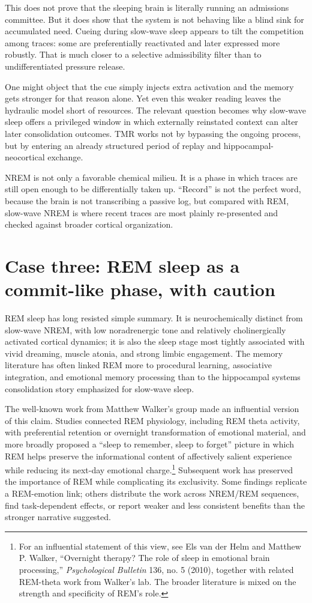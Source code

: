 \documentclass[11pt]{article}
\begin{document}
This does not prove that the sleeping brain is literally running an admissions committee. But it does show that the system is not behaving like a blind sink for accumulated need. Cueing during slow-wave sleep appears to tilt the competition among traces: some are preferentially reactivated and later expressed more robustly. That is much closer to a selective admissibility filter than to undifferentiated pressure release.

One might object that the cue simply injects extra activation and the memory gets stronger for that reason alone. Yet even this weaker reading leaves the hydraulic model short of resources. The relevant question becomes why slow-wave sleep offers a privileged window in which externally reinstated context can alter later consolidation outcomes. TMR works not by bypassing the ongoing process, but by entering an already structured period of replay and hippocampal-neocortical exchange.

NREM is not only a favorable chemical milieu. It is a phase in which traces are still open enough to be differentially taken up. ``Record'' is not the perfect word, because the brain is not transcribing a passive log, but compared with REM, slow-wave NREM is where recent traces are most plainly re-presented and checked against broader cortical organization.

\section{Case three: REM sleep as a commit-like phase, with caution}
REM sleep has long resisted simple summary. It is neurochemically distinct from slow-wave NREM, with low noradrenergic tone and relatively cholinergically activated cortical dynamics; it is also the sleep stage most tightly associated with vivid dreaming, muscle atonia, and strong limbic engagement. The memory literature has often linked REM more to procedural learning, associative integration, and emotional memory processing than to the hippocampal systems consolidation story emphasized for slow-wave sleep.

The well-known work from Matthew Walker's group made an influential version of this claim. Studies connected REM physiology, including REM theta activity, with preferential retention or overnight transformation of emotional material, and more broadly proposed a ``sleep to remember, sleep to forget'' picture in which REM helps preserve the informational content of affectively salient experience while reducing its next-day emotional charge.\footnote{For an influential statement of this view, see Els van der Helm and Matthew P. Walker, ``Overnight therapy? The role of sleep in emotional brain processing,'' \emph{Psychological Bulletin} 136, no. 5 (2010), together with related REM-theta work from Walker's lab. The broader literature is mixed on the strength and specificity of REM's role.} Subsequent work has preserved the importance of REM while complicating its exclusivity. Some findings replicate a REM-emotion link; others distribute the work across NREM/REM sequences, find task-dependent effects, or report weaker and less consistent benefits than the stronger narrative suggested.
\end{document}
